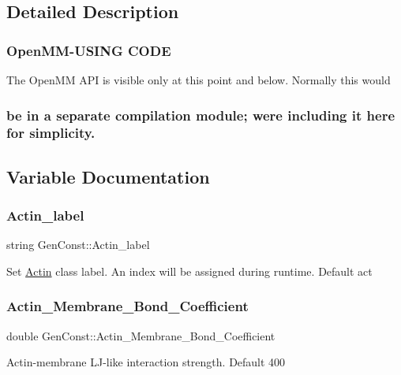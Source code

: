 \subsection{Detailed Description}


 \subsubsection*{Open\+M\+M-\/\+U\+S\+I\+NG C\+O\+DE }

The Open\+MM A\+PI is visible only at this point and below. Normally this would \subsubsection*{be in a separate compilation module; we\textquotesingle{}re including it here for simplicity. }

\subsection{Variable Documentation}
\mbox{\label{namespaceGenConst_a9acdda43f7e8ee196130df7f5966e658}} 
\subsubsection{\texorpdfstring{Actin\_label}{Actin\_label}}
{\footnotesize\ttfamily string Gen\+Const\+::\+Actin\+\_\+label}

Set \mbox{\hyperlink{classActin}{Actin}} class label. An index will be assigned during runtime. Default act \mbox{\label{namespaceGenConst_a605feaf5d31899243b6222624163cf29}} 
\subsubsection{\texorpdfstring{Actin\_Membrane\_Bond\_Coefficient}{Actin\_Membrane\_Bond\_Coefficient}}
{\footnotesize\ttfamily double Gen\+Const\+::\+Actin\+\_\+\+Membrane\+\_\+\+Bond\+\_\+\+Coefficient}

Actin-\/membrane L\+J-\/like interaction strength. Default 400 \mbox{\label{namespaceGenConst_a9deb819215b4b909972f699931e4e155}} 
